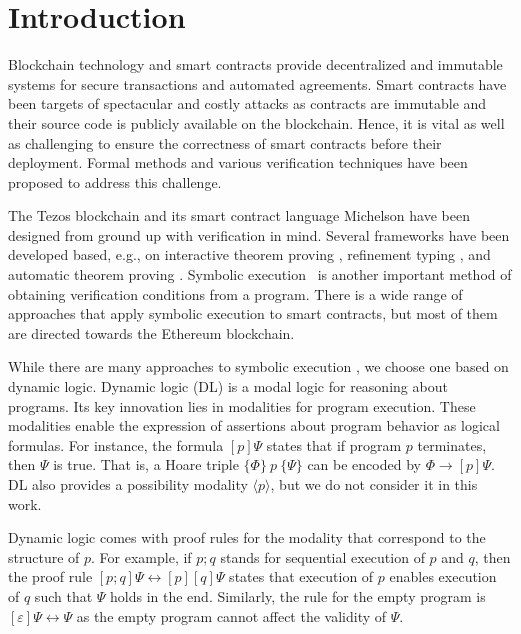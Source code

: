 \section{Introduction}
\label{sec:introduction}

Blockchain technology and smart contracts provide decentralized and
immutable systems for secure transactions and automated agreements.
Smart contracts have been targets of spectacular and costly attacks as
contracts are immutable and their source code is publicly available on
the blockchain. 
Hence, it is vital as well as challenging to ensure the correctness of smart contracts
before their deployment. Formal methods and various verification
techniques have been proposed to address this challenge.

The Tezos blockchain \cite{tezos-whitepaper} and its smart contract
language Michelson have been designed from
ground up with verification in mind. Several frameworks have been
developed based, e.g., on interactive theorem proving \cite{micho},
refinement typing \cite{helmholtz}, and automatic theorem
proving \cite{WHYtool}. 
Symbolic execution~\cite{DBLP:journals/cacm/King76} is another important method of obtaining verification
conditions from a program. There is a wide range of approaches that
apply symbolic execution to smart contracts, but most of them are
directed towards the Ethereum blockchain.

While there are many approaches to symbolic execution
\cite{DBLP:conf/osdi/CadarDE08,DBLP:conf/icse/CsallnerTS08,Pasareanu2020},
we choose one based on dynamic logic.
Dynamic logic (DL) \cite{DL} is a modal logic for reasoning about
programs. Its key innovation lies in modalities for program
execution. These modalities enable the expression of assertions about
program behavior as logical formulas. For instance, the formula $[p]
\Psi$ states that if program $p$ terminates, then $\Psi$ is true. That
is, a Hoare triple $\{\Phi\}~p~\{ \Psi\}$ can be
encoded by $\Phi \to [p]\Psi$. DL also provides a possibility modality
$\langle p\rangle$, but we do not consider it in this work.

Dynamic logic comes with proof rules for the modality that correspond
to the structure of $p$. For example, if $p;q$ stands for sequential
execution of $p$ and $q$, then the proof rule $[p;q]\Psi
\leftrightarrow [p][q]\Psi$ states that execution of $p$ enables
execution of $q$ such that $\Psi$ holds in the end. Similarly, the
rule for the empty program is $[\varepsilon]\Psi \leftrightarrow \Psi$
as the empty program cannot affect the validity of $\Psi$.

